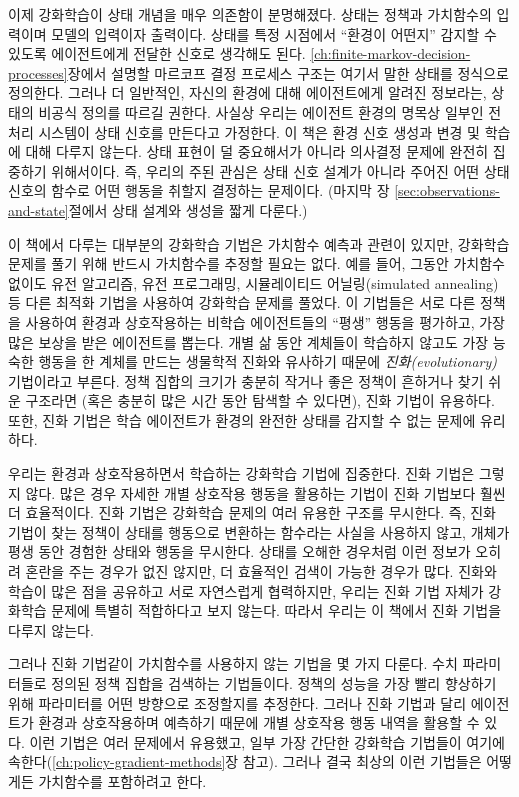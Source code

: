 이제 강화학습이 상태 개념을 매우 의존함이 분명해졌다. 상태는 정책과 가치함수의
입력이며 모델의 입력이자 출력이다. 상태를 특정 시점에서 ``환경이 어떤지'' 감지할
수 있도록 에이전트에게 전달한 신호로 생각해도 된다.
\ref{ch:finite-markov-decision-processes}장에서 설명할 마르코프 결정 프로세스
구조는 여기서 말한 상태를 정식으로 정의한다. 그러나 더 일반적인, 자신의 환경에
대해 에이전트에게 알려진 정보라는, 상태의 비공식 정의를 따르길 권한다. 사실상
우리는 에이전트 환경의 명목상 일부인 전처리 시스템이 상태 신호를 만든다고
가정한다. 이 책은 환경 신호 생성과 변경 및 학습에 대해 다루지 않는다. 상태
표현이 덜 중요해서가 아니라 의사결정 문제에 완전히 집중하기 위해서이다. 즉,
우리의 주된 관심은 상태 신호 설계가 아니라 주어진 어떤 상태 신호의 함수로 어떤
행동을 취할지 결정하는 문제이다. (마지막 장
\ref{sec:observations-and-state}절에서 상태 설계와 생성을 짧게 다룬다.)

이 책에서 다루는 대부분의 강화학습 기법은 가치함수 예측과 관련이 있지만,
강화학습 문제를 풀기 위해 반드시 가치함수를 추정할 필요는 없다. 예를 들어,
그동안 가치함수 없이도 유전 알고리즘, 유전 프로그래밍, 시뮬레이티드
어닐링(simulated annealing) 등 다른 최적화 기법을 사용하여 강화학습 문제를
풀었다. 이 기법들은 서로 다른 정책을 사용하여 환경과 상호작용하는 비학습
에이전트들의 ``평생'' 행동을 평가하고, 가장 많은 보상을 받은 에이전트를 뽑는다.
개별 삶 동안 계체들이 학습하지 않고도 가장 능숙한 행동을 한 계체를 만드는
생물학적 진화와 유사하기 때문에 \emph{진화(evolutionary)} 기법이라고 부른다.
정책 집합의 크기가 충분히 작거나 좋은 정책이 흔하거나 찾기 쉬운 구조라면 (혹은
충분히 많은 시간 동안 탐색할 수 있다면), 진화 기법이 유용하다. 또한, 진화 기법은
학습 에이전트가 환경의 완전한 상태를 감지할 수 없는 문제에 유리하다.

우리는 환경과 상호작용하면서 학습하는 강화학습 기법에 집중한다.
진화 기법은 그렇지 않다.
많은 경우 자세한 개별 상호작용 행동을 활용하는 기법이 진화 기법보다 훨씬 더
효율적이다. 진화 기법은 강화학습 문제의 여러 유용한 구조를 무시한다.
즉, 진화 기법이 찾는 정책이 상태를 행동으로 변환하는 함수라는 사실을 사용하지
않고, 개체가 평생 동안 경험한 상태와 행동을 무시한다. 상태를 오해한 경우처럼
이런 정보가 오히려 혼란을 주는 경우가 없진 않지만, 더 효율적인 검색이 가능한
경우가 많다. 진화와 학습이 많은 점을 공유하고 서로 자연스럽게 협력하지만, 우리는
진화 기법 자체가 강화학습 문제에 특별히 적합하다고 보지 않는다. 따라서 우리는 이
책에서 진화 기법을 다루지 않는다.

그러나 진화 기법같이 가치함수를 사용하지 않는 기법을 몇 가지 다룬다. 수치
파라미터들로 정의된 정책 집합을 검색하는 기법들이다. 정책의 성능을 가장 빨리
향상하기 위해 파라미터를 어떤 방향으로 조정할지를 추정한다. 그러나 진화 기법과
달리 에이전트가 환경과 상호작용하며 예측하기 때문에 개별 상호작용 행동 내역을
활용할 수 있다.
이런 기법은 여러 문제에서 유용했고, 일부 가장 간단한 강화학습 기법들이 여기에
속한다(\ref{ch:policy-gradient-methods}장 참고). 그러나 결국 최상의 이런
기법들은 어떻게든 가치함수를 포함하려고 한다.

